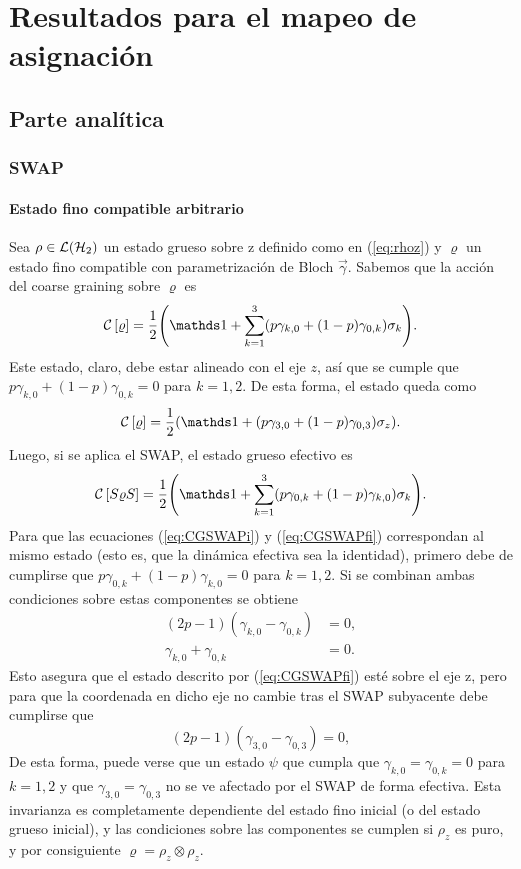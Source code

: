 \chapter{Resultados para el mapeo de asignación}

\section{Parte analítica}


\subsection{SWAP}
\subsubsection{Estado fino compatible arbitrario}
Sea $\rho\in\mathcal{L}(\mathcal{H}_{2})$ un estado grueso sobre z definido como en (\ref{eq:rhoz}) y $\varrho$ un estado fino compatible con parametrización de Bloch $\vec{\gamma}$. Sabemos que la acción del coarse graining sobre $\varrho$ es
\begin{equation}\label{eq:CGSWAPprei}
\CG{\varrho}=\frac{1}{2}\qty(\Id+\sum_{k=1}^{3}(p\gamma_{k,0}+(1-p)\gamma_{0,k})\sigma_{k}).
\end{equation}
Este estado, claro, debe estar alineado con el eje $z$, así que se cumple que $p\gamma_{k,0}+(1-p)\gamma_{0,k}=0$ para $k=1,2$. De esta forma, el estado queda como
\begin{equation}\label{eq:CGSWAPi}
\CG{\varrho}=\frac{1}{2}\qty(\Id+(p\gamma_{3,0}+(1-p)\gamma_{0,3})\sigma_{z}).
\end{equation}
Luego, si se aplica el SWAP, el estado grueso efectivo es
\begin{equation}\label{eq:CGSWAPfi}
\CG{S\varrho S}=\frac{1}{2}\qty(\Id+\sum_{k=1}^{3}(p\gamma_{0,k}+(1-p)\gamma_{k,0})\sigma_{k}).
\end{equation}
Para que las ecuaciones (\ref{eq:CGSWAPi}) y (\ref{eq:CGSWAPfi}) correspondan al mismo estado (esto es, que la dinámica efectiva sea la identidad), primero debe de cumplirse que $p\gamma_{0,k}+(1-p)\gamma_{k,0}=0$ para $k=1,2$. Si se combinan ambas condiciones sobre estas componentes se obtiene
\begin{align*}
(2p-1)(\gamma_{k,0}-\gamma_{0,k})&=0,\\
\gamma_{k,0}+\gamma_{0,k}&=0.
\end{align*}
Esto asegura que el estado descrito por (\ref{eq:CGSWAPfi}) esté sobre el eje z, pero para que la coordenada en dicho eje no cambie tras el SWAP subyacente debe cumplirse que 
\begin{equation*}
(2p-1)(\gamma_{3,0}-\gamma_{0,3})=0,
\end{equation*}
De esta forma, puede verse que un estado $\psi$ que cumpla que $\gamma_{k,0}=\gamma_{0,k}=0$ para $k=1,2$ y que $\gamma_{3,0}=\gamma_{0,3}$ no se ve afectado por el SWAP de forma efectiva. Esta invarianza es completamente dependiente del estado fino inicial (o del estado grueso inicial), y las condiciones sobre las componentes se cumplen  si $\rho_{z}$ es puro, y por consiguiente $\varrho=\rho_{z}\otimes\rho_{z}$.

